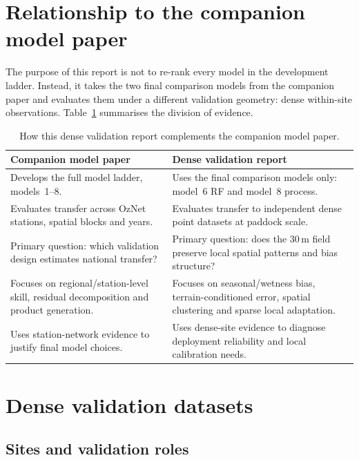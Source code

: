 \documentclass[11pt,a4paper]{article}
\newcommand{\modelSix}{model~6 RF}
\newcommand{\modelEight}{model~8 process}
\begin{document}
\section{Relationship to the companion model paper}\label{sec:sister}

The purpose of this report is not to re-rank every model in the development
ladder.  Instead, it takes the two final comparison models from the companion
paper and evaluates them under a different validation geometry: dense
within-site observations.  Table~\ref{tab:sister} summarises the division of
evidence.

\begin{table}[htbp]
\centering
\caption{How this dense validation report complements the companion model
paper.}
\label{tab:sister}
\begin{tabularx}{\textwidth}{>{\raggedright\arraybackslash}X
                              >{\raggedright\arraybackslash}X}
\toprule
\textbf{Companion model paper} & \textbf{Dense validation report} \\
\midrule
Develops the full model ladder, models~1--8. &
Uses the final comparison models only: \modelSix{} and \modelEight{}. \\
Evaluates transfer across OzNet stations, spatial blocks and years. &
Evaluates transfer to independent dense point datasets at paddock scale. \\
Primary question: which validation design estimates national transfer? &
Primary question: does the 30\,m field preserve local spatial patterns and
bias structure? \\
Focuses on regional/station-level skill, residual decomposition and product
generation. &
Focuses on seasonal/wetness bias, terrain-conditioned error, spatial clustering
and sparse local adaptation. \\
Uses station-network evidence to justify final model choices. &
Uses dense-site evidence to diagnose deployment reliability and local
calibration needs. \\
\bottomrule
\end{tabularx}
\end{table}

\section{Dense validation datasets}\label{sec:data}

\subsection{Sites and validation roles}\label{sec:sites}
\end{document}
